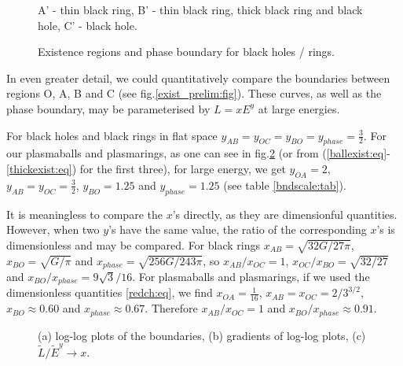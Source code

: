 \documentclass[12pt,a4paper]{article}
\newcommand{\ra}{\rightarrow}
\newcommand{\tE}{\widetilde{E}}
\newcommand{\tL}{\widetilde{L}}
\begin{document}
\begin{figure}
\begin{center}
  \small{A' - thin black ring, B' - thin black ring, thick black ring
  and black hole, C' - black hole.}\\
  
  \caption{Existence regions and phase boundary for black holes /
rings.}\label{brphase:fig}
\end{center}
\end{figure}

In even greater detail, we could quantitatively compare the
boundaries between regions O, A, B and C (see
fig.\ref{exist_prelim:fig}). These curves, as well as the phase
boundary, may be parameterised by $L=xE^y$ at large energies.

For black holes and black rings in flat space
$y_{AB}=y_{OC}=y_{BO}=y_{phase}=\frac{3}{2}$. For our plasmaballs
and plasmarings, as one can see in fig.\ref{logboundary:fig} (or
from (\ref{ballexist:eq}-\ref{thickexist:eq}) for the first three),
for large energy, we get $y_{OA}=2$, $y_{AB}=y_{OC}=\frac{3}{2}$,
$y_{BO}=1.25$ and $y_{phase}=1.25$ (see table \ref{bndscale:tab}).

It is meaningless to compare the $x$'s directly, as they are
dimensionful quantities. However, when two $y$'s have the same
value, the ratio of the corresponding $x$'s is dimensionless and may
be compared. For black rings $x_{AB}=\sqrt{32G/27\pi}$,
$x_{BO}=\sqrt{G/\pi}$ and $x_{phase}=\sqrt{256G/243\pi}$, so
$x_{AB}/x_{OC}=1$, $x_{OC}/x_{BO}=\sqrt{32/27}$ and
$x_{BO}/x_{phase}=9\sqrt{3}/16$. For plasmaballs and plasmarings, if
we used the dimensionless quantities \eqref{redch:eq}, we find
$x_{OA}=\frac{1}{16}$, $x_{AB}=x_{OC}=2/3^{3/2}$, $x_{BO}\approx
0.60$ and $x_{phase}\approx 0.67$. Therefore $x_{AB}/x_{OC}=1$ and
$x_{BO}/x_{phase}\approx 0.91$.


\begin{figure}
%
 \begin{center}
   
   
   
 \caption{(a) log-log plots of the boundaries, (b) gradients of
log-log plots, (c) $\tL/\tE^y \ra x$.}\label{logboundary:fig}
 \end{center}
\end{figure}
\end{document}
